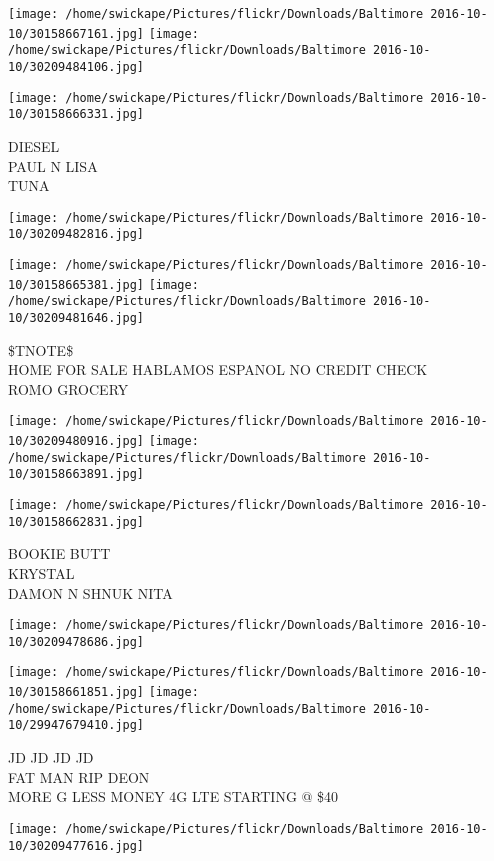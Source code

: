 \documentclass[10pt,letterpaper]{article}
\begin{document}
\texttt{[image: /home/swickape/Pictures/flickr/Downloads/Baltimore 2016-10-10/30158667161.jpg]}
\texttt{[image: /home/swickape/Pictures/flickr/Downloads/Baltimore 2016-10-10/30209484106.jpg]}

\texttt{[image: /home/swickape/Pictures/flickr/Downloads/Baltimore 2016-10-10/30158666331.jpg]}

DIESEL\\
PAUL N LISA\\
TUNA
\pagebreak

\texttt{[image: /home/swickape/Pictures/flickr/Downloads/Baltimore 2016-10-10/30209482816.jpg]}

\vspace{0.25in}
\texttt{[image: /home/swickape/Pictures/flickr/Downloads/Baltimore 2016-10-10/30158665381.jpg]}
\texttt{[image: /home/swickape/Pictures/flickr/Downloads/Baltimore 2016-10-10/30209481646.jpg]}

\$TNOTE\$\\
HOME FOR SALE HABLAMOS ESPANOL NO CREDIT CHECK\\
ROMO GROCERY
\pagebreak

\texttt{[image: /home/swickape/Pictures/flickr/Downloads/Baltimore 2016-10-10/30209480916.jpg]}
\texttt{[image: /home/swickape/Pictures/flickr/Downloads/Baltimore 2016-10-10/30158663891.jpg]}

\vspace{0.25in}
\texttt{[image: /home/swickape/Pictures/flickr/Downloads/Baltimore 2016-10-10/30158662831.jpg]}

BOOKIE BUTT\\
KRYSTAL\\
DAMON N SHNUK NITA
\pagebreak

\texttt{[image: /home/swickape/Pictures/flickr/Downloads/Baltimore 2016-10-10/30209478686.jpg]}

\vspace{0.25in}
\texttt{[image: /home/swickape/Pictures/flickr/Downloads/Baltimore 2016-10-10/30158661851.jpg]}
\texttt{[image: /home/swickape/Pictures/flickr/Downloads/Baltimore 2016-10-10/29947679410.jpg]}

JD JD JD JD\\
FAT MAN RIP DEON\\
MORE G LESS MONEY 4G LTE STARTING @ \$40
\pagebreak

\texttt{[image: /home/swickape/Pictures/flickr/Downloads/Baltimore 2016-10-10/30209477616.jpg]}
\end{document}
